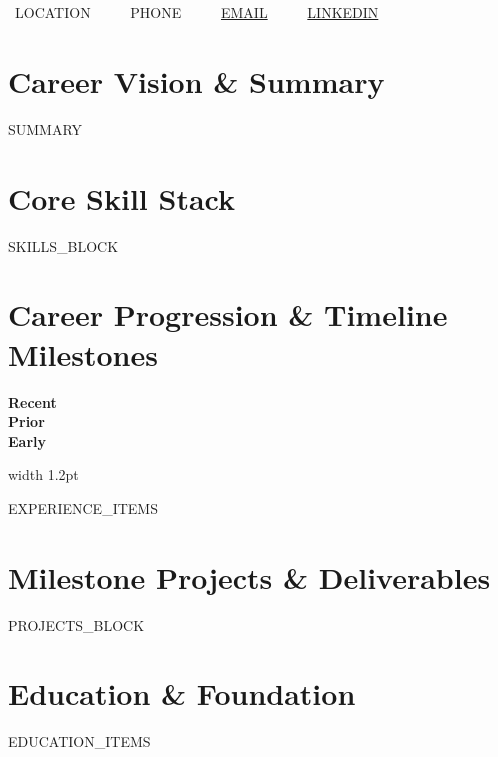 \documentclass[10pt,letterpaper]{article}
\begin{document}
\begin{center}
  {\Huge \textbf{}} \\[3pt]
  {\normalsize \textbf{}} \\[5pt]
  \small
  \faMapMarker* \ {{LOCATION}} \ \ \textbar\ \ 
  \faPhone \ {{PHONE}} \ \ \textbar\ \ 
  \faEnvelope \ \href{mailto:{{EMAIL}}}{{{EMAIL}}} \ \ \textbar\ \ 
  \faLinkedin \ \href{https://{{LINKEDIN}}}{{{LINKEDIN}}}
\end{center}

\vspace{-2pt}

\section{Career Vision \& Summary}
\small
{{SUMMARY}}

\section{Core Skill Stack}
\small
{{SKILLS_BLOCK}}

\section{Career Progression \& Timeline Milestones}
\small
\noindent
\begin{minipage}[t]{0.14\textwidth}
  \raggedleft
  \color{timelinepurple}\bfseries
  \small
  Recent \\
  \vspace{22pt}
  Prior \\
  \vspace{22pt}
  Early
\end{minipage}
\hfill
{\color{timelinepurple}\vrule width 1.2pt}
\hfill
\begin{minipage}[t]{0.82\textwidth}
  {{EXPERIENCE_ITEMS}}
\end{minipage}

\vspace{6pt}

\section{Milestone Projects \& Deliverables}
\small
{{PROJECTS_BLOCK}}

\section{Education \& Foundation}
\small
{{EDUCATION_ITEMS}}
\end{document}
